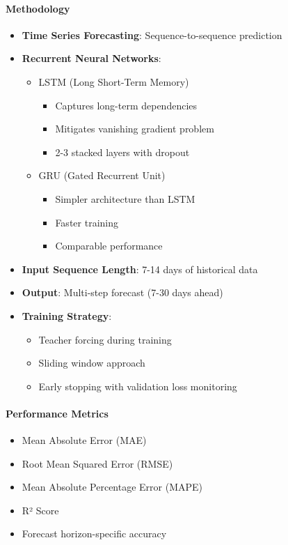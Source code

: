 \documentclass[12pt,a4paper]{article}
\begin{document}
\paragraph{Methodology}
\begin{itemize}[leftmargin=*]
    \item \textbf{Time Series Forecasting}: Sequence-to-sequence prediction
    \item \textbf{Recurrent Neural Networks}:
    \begin{itemize}
        \item LSTM (Long Short-Term Memory)
        \begin{itemize}
            \item Captures long-term dependencies
            \item Mitigates vanishing gradient problem
            \item 2-3 stacked layers with dropout
        \end{itemize}
        \item GRU (Gated Recurrent Unit)
        \begin{itemize}
            \item Simpler architecture than LSTM
            \item Faster training
            \item Comparable performance
        \end{itemize}
    \end{itemize}
    \item \textbf{Input Sequence Length}: 7-14 days of historical data
    \item \textbf{Output}: Multi-step forecast (7-30 days ahead)
    \item \textbf{Training Strategy}:
    \begin{itemize}
        \item Teacher forcing during training
        \item Sliding window approach
        \item Early stopping with validation loss monitoring
    \end{itemize}
\end{itemize}

\paragraph{Performance Metrics}
\begin{itemize}[leftmargin=*]
    \item Mean Absolute Error (MAE)
    \item Root Mean Squared Error (RMSE)
    \item Mean Absolute Percentage Error (MAPE)
    \item R² Score
    \item Forecast horizon-specific accuracy
\end{itemize}
\end{document}
